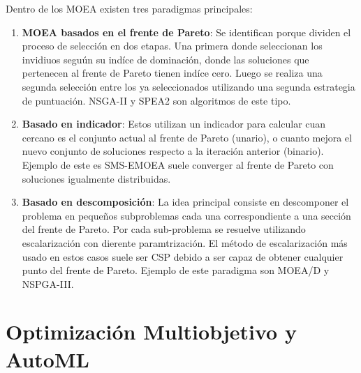 Dentro de los MOEA existen tres paradigmas principales:
\begin{enumerate}
    \item \textbf{MOEA basados en el frente de Pareto}: Se identifican porque dividen el proceso de selecci\'on en dos etapas. Una primera donde seleccionan los invidiuos segu\'un su ind\'ice de dominaci\'on, donde las soluciones que pertenecen al frente de Pareto tienen ind\'ice cero. Luego se realiza una segunda selecci\'on entre los ya seleccionados utilizando una segunda estrategia de puntuaci\'on. NSGA-II y SPEA2 son algoritmos de este tipo.

    \item \textbf{Basado en indicador}: Estos utilizan un indicador para calcular cuan cercano es el conjunto actual al frente de Pareto (unario), o cuanto mejora el nuevo conjunto de soluciones respecto a la iteraci\'on anterior (binario). Ejemplo de este es SMS-EMOEA suele converger al frente de Pareto con soluciones igualmente distribuidas.

    \item \textbf{Basado en descomposici\'on}: La idea principal consiste en descomponer el problema en pequeños subproblemas cada una correspondiente a una secci\'on del frente de Pareto. Por cada sub-problema se resuelve utilizando escalarizaci\'on con dierente paramtrizaci\'on. El m\'etodo de escalarizaci\'on m\'as usado en estos casos suele ser CSP debido a ser capaz de obtener cualquier punto del frente de Pareto. Ejemplo de este paradigma son MOEA/D y NSPGA-III.
\end{enumerate}





\section{Optimizaci\'on Multiobjetivo y AutoML}


